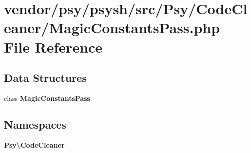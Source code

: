 \section{vendor/psy/psysh/src/\+Psy/\+Code\+Cleaner/\+Magic\+Constants\+Pass.php File Reference}
\label{_magic_constants_pass_8php}
\subsection*{Data Structures}
\begin{DoxyCompactItemize}
\item 
class {\bf Magic\+Constants\+Pass}
\end{DoxyCompactItemize}
\subsection*{Namespaces}
\begin{DoxyCompactItemize}
\item 
 {\bf Psy\textbackslash{}\+Code\+Cleaner}
\end{DoxyCompactItemize}
